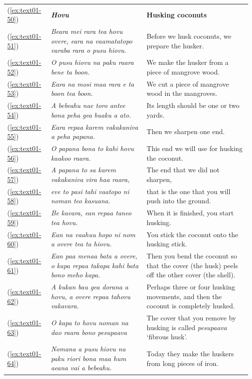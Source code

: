 \documentclass[output=paper]{langscibook}
\begin{document}
\begin{xltabular}{\textwidth}{lXX}
    (\ref{ex:text01-50})&\textit{\textbf{Hovu}}&\textbf{Husking coconuts}\\
    (\ref{ex:text01-51})&\textit{Beara mei rara tea hovu overe, eara na vaamatatopo varaba rara o pusu hiovu.}&Before we husk coconuts, we prepare the husker.\\
    (\ref{ex:text01-52})&\textit{O pusu hiovu na paku raara bene ta boon.}&We make the husker from a piece of mangrove wood.\\
    (\ref{ex:text01-53})&\textit{Eara na mosi maa rara e ta boon tea boon.}&We cut a piece of mangrove wood in the mangroves.\\
    (\ref{ex:text01-54})&\textit{A bebeahu nae toro antee bona peha gea buaku a ato.}&Its length should be one or two yards.\\
    (\ref{ex:text01-55})&\textit{Eara repaa karem vakakaniva a peha papana.}&Then we sharpen one end.\\
    (\ref{ex:text01-56})&\textit{O papana bona to kahi hovu kaakoo raara.}&This end we will use for husking the coconut.\\
    (\ref{ex:text01-57})&\textit{A papana to sa karem vakakaniva vira haa raara,}&The end that we did not sharpen,\\
    (\ref{ex:text01-58})&\textit{eve to pasi tahi vaatopo ni noman teo kasuana.}&that is the one that you will push into the ground.\\
    (\ref{ex:text01-59})&\textit{Be kavara, ean repaa taneo tea hovu.}&When it is finished, you start husking.\\
    (\ref{ex:text01-60})&\textit{Ean na vaahuu hopo ni nom a overe tea ta hiovu.}&You stick the coconut onto the husking stick.\\
    (\ref{ex:text01-61})&\textit{Ean paa menaa bata a overe, o kapa repaa takapa kahi bata bono meho kapa.}&Then you bend the coconut so that the cover (the husk) peels off the other cover (the shell).\\
    (\ref{ex:text01-62})&\textit{A kukan bau gea dorana a hovu, a overe repaa tahovu vakavara.}&Perhaps three or four husking movements, and then the coconut is completely husked.\\
    (\ref{ex:text01-63})&\textit{O kapa to hovu noman na dao raara bono pesupaava}&The cover that you remove by husking is called \textit{pesupaava} `fibrous husk’.\\
    (\ref{ex:text01-64})&\textit{Nomana a pusu hiovu na paku riori bona maa hum aeana vai a bebeahu.}&Today they make the huskers from long pieces of iron.\\

\end{xltabular}
\end{document}
